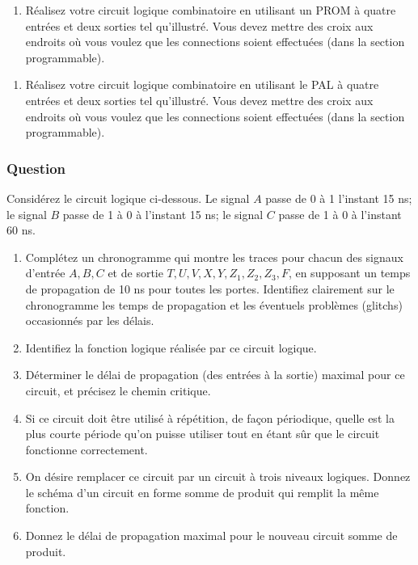 \documentclass[11pt]{article}
\begin{document}
\begin{enumerate}
\item Réalisez votre circuit logique combinatoire en utilisant un PROM à
quatre entrées et deux sorties tel qu'illustré.
Vous devez mettre des croix aux endroits où vous voulez que les
connections soient effectuées (dans la section programmable).
\end{enumerate}
\begin{center}

\end{center}

\begin{enumerate}
\item Réalisez votre circuit logique combinatoire en utilisant le PAL à
quatre entrées et deux sorties tel qu'illustré.
Vous devez mettre des croix aux endroits où vous voulez que les
connections soient effectuées (dans la section programmable).
\end{enumerate}
\begin{center}

\end{center}

\subsubsection*{Question}
\label{sec:org893024c}
Considérez le circuit logique ci-dessous. Le signal \(A\) passe de 0 à 1
l'instant 15 ns; le signal \(B\) passe de 1 à 0 à l'instant 15 ns; le
signal \(C\) passe de 1 à 0 à l'instant 60 ns.
\begin{center}

\end{center}

\begin{enumerate}
\item Complétez un chronogramme qui montre les traces pour chacun des
signaux d'entrée \(A, B, C\) et de sortie \(T, U, V, X, Y, Z_1,
       Z_2, Z_3, F\), en supposant un temps de propagation de 10 ns
pour toutes les portes. Identifiez clairement sur le
chronogramme les temps de propagation et les éventuels problèmes
(glitchs) occasionnés par les délais.

\item Identifiez la fonction logique réalisée par ce circuit logique.

\item Déterminer le délai de propagation (des entrées à la sortie)
maximal pour ce circuit, et précisez le chemin critique.

\item Si ce circuit doit être utilisé à répétition, de façon périodique,
quelle est la plus courte période qu'on puisse utiliser tout en
étant sûr que le circuit fonctionne correctement.

\item On désire remplacer ce circuit par un circuit à trois niveaux
logiques. Donnez le schéma d'un circuit en forme somme de produit
qui remplit la même fonction.

\item Donnez le délai de propagation maximal pour le nouveau circuit
somme de produit.
\end{enumerate}
\end{document}
